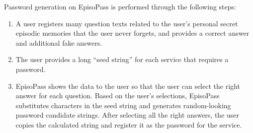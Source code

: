 \documentclass{sigchi}
\begin{document}
% 

Password generation on EpisoPass is performed through the following steps:

\begin{enumerate}
\item A user registers many question texts related to the user's personal
secret episodic memories that the user never forgets,
and provides a correct answer and additional fake answers.

\item The user provides a long ``seed string'' for each service that requires
a password.

\item EpisoPass shows the data to the user so that
the user can select the right answer for each question.
Based on the user's selections,
EpisoPass substitutes characters in the seed string and generates
random-looking password candidate strings.
After selecting all the right answers,
the user copies the calculated string
and register it as the password for the service.
\end{enumerate}
\end{document}
